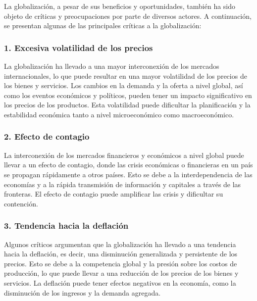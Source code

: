 \documentclass[
  letterpaper,
  DIV=11,
  numbers=noendperiod]{scrartcl}
\begin{document}
La globalización, a pesar de sus beneficios y oportunidades, también ha
sido objeto de críticas y preocupaciones por parte de diversos actores.
A continuación, se presentan algunas de las principales críticas a la
globalización:

\hypertarget{excesiva-volatilidad-de-los-precios}{%
\subsubsection{1. Excesiva volatilidad de los
precios}\label{excesiva-volatilidad-de-los-precios}}

La globalización ha llevado a una mayor interconexión de los mercados
internacionales, lo que puede resultar en una mayor volatilidad de los
precios de los bienes y servicios. Los cambios en la demanda y la oferta
a nivel global, así como los eventos económicos y políticos, pueden
tener un impacto significativo en los precios de los productos. Esta
volatilidad puede dificultar la planificación y la estabilidad económica
tanto a nivel microeconómico como macroeconómico.

\hypertarget{efecto-de-contagio}{%
\subsubsection{2. Efecto de contagio}\label{efecto-de-contagio}}

La interconexión de los mercados financieros y económicos a nivel global
puede llevar a un efecto de contagio, donde las crisis económicas o
financieras en un país se propagan rápidamente a otros países. Esto se
debe a la interdependencia de las economías y a la rápida transmisión de
información y capitales a través de las fronteras. El efecto de contagio
puede amplificar las crisis y dificultar su contención.

\hypertarget{tendencia-hacia-la-deflaciuxf3n}{%
\subsubsection{3. Tendencia hacia la
deflación}\label{tendencia-hacia-la-deflaciuxf3n}}

Algunos críticos argumentan que la globalización ha llevado a una
tendencia hacia la deflación, es decir, una disminución generalizada y
persistente de los precios. Esto se debe a la competencia global y la
presión sobre los costos de producción, lo que puede llevar a una
reducción de los precios de los bienes y servicios. La deflación puede
tener efectos negativos en la economía, como la disminución de los
ingresos y la demanda agregada.
\end{document}
